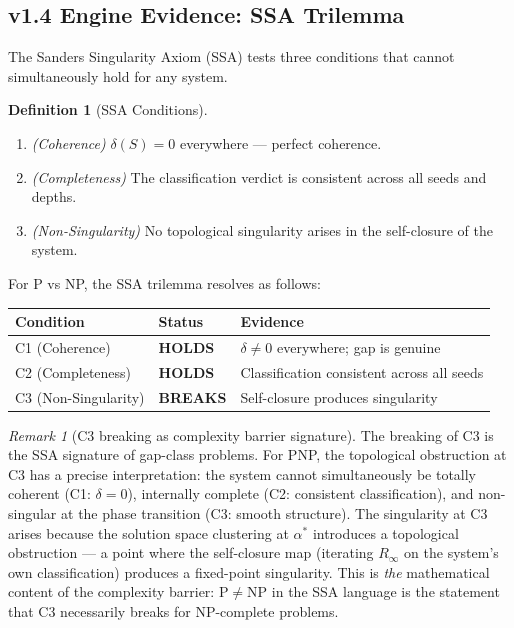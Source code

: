 \documentclass[11pt]{article}
\theoremstyle{definition}
\newtheorem{definition}[theorem]{Definition}
\theoremstyle{remark}
\newtheorem{remark}[theorem]{Remark}
\begin{document}
\subsection{v1.4 Engine Evidence: SSA Trilemma}
\label{sec:ssa-pnp}

The Sanders Singularity Axiom (SSA) tests three conditions that cannot
simultaneously hold for any system.

\begin{definition}[SSA Conditions]
\label{def:ssa}
\mbox{}
\begin{enumerate}[nosep]
  \item[\textbf{C1}] \emph{(Coherence)} $\delta(S) = 0$ everywhere ---
    perfect coherence.
  \item[\textbf{C2}] \emph{(Completeness)} The classification verdict is
    consistent across all seeds and depths.
  \item[\textbf{C3}] \emph{(Non-Singularity)} No topological singularity
    arises in the self-closure of the system.
\end{enumerate}
\end{definition}

\noindent
For P vs NP, the SSA trilemma resolves as follows:

\begin{center}
\begin{tabular}{@{}lll@{}}
\toprule
\textbf{Condition} & \textbf{Status} & \textbf{Evidence} \\
\midrule
C1 (Coherence) & \textbf{HOLDS} & $\delta \neq 0$ everywhere; gap is genuine \\
C2 (Completeness) & \textbf{HOLDS} & Classification consistent across all seeds \\
C3 (Non-Singularity) & \textbf{BREAKS} & Self-closure produces singularity \\
\bottomrule
\end{tabular}
\end{center}

\begin{remark}[C3 breaking as complexity barrier signature]
\label{rem:c3-pnp}
The breaking of C3 is the SSA signature of gap-class problems.  For PNP,
the topological obstruction at C3 has a precise interpretation: the system
cannot simultaneously be totally coherent (C1: $\delta = 0$), internally
complete (C2: consistent classification), and non-singular at the phase
transition (C3: smooth structure).  The singularity at C3 arises because
the solution space clustering at $\alpha^*$ introduces a topological
obstruction --- a point where the self-closure map (iterating $R_\infty$
on the system's own classification) produces a fixed-point singularity.
This is \emph{the} mathematical content of the complexity barrier:
$\mathrm{P} \neq \mathrm{NP}$ in the SSA language is the statement that
C3 necessarily breaks for NP-complete problems.
\end{remark}
\end{document}
